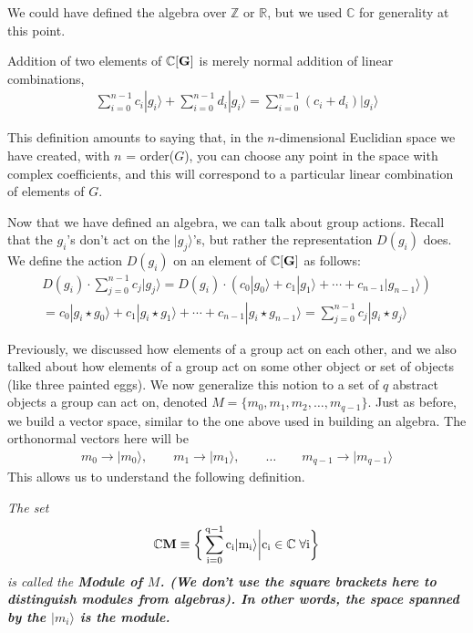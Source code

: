 \documentclass[12pt,epsf]{article}
\def\nolabel{\nonumber }
\def\nolabel{\nonumber }
\begin{document}
We could have defined the algebra over $\mathbb{Z}$ or $\mathbb{R}$,
but we used $\mathbb{C}$ for generality at this point.	

Addition of two elements of $\mathbb{C}[\bf G\rm]$ is merely normal
addition of linear combinations, 
\begin{eqnarray}
\sum_{i=0}^{n-1} c_i |g_i\rangle + \sum_{i=0}^{n-1}d_i|g_i\rangle =
\sum_{i=0}^{n-1}(c_i+d_i)|g_i\rangle \nolabel 
\end{eqnarray}

This definition amounts to saying that, in the $n$-dimensional
Euclidian space we have created, with $n$ = order($G$), you can choose any point in the space
with complex coefficients, and this will correspond to a particular
linear combination of elements of $G$.	

Now that we have defined an algebra, we can talk about group actions. 
Recall that the $g_i$'s don't act on the $|g_j\rangle$'s, but rather
the representation $D(g_i)$ does.  We define the action $D(g_i)$ on an
element of $\mathbb{C}[\bf G\rm]$ as follows:
\begin{eqnarray}
D(g_i) \cdot \sum_{j=0}^{n-1} c_j |g_j\rangle = D(g_i) \cdot
(c_0|g_0\rangle + c_1|g_1\rangle+ \cdots + c_{n-1}|g_{n-1}\rangle)
\nolabel \\
= c_0|g_i\star g_0\rangle + c_1|g_i \star g_1\rangle + \cdots +
c_{n-1}|g_i \star g_{n-1}\rangle = \sum_{j=0}^{n-1} c_j|g_i \star
g_j\rangle\nolabel 
\end{eqnarray}

Previously, we discussed how elements of a group act on each other, and
we also talked about how elements of a group act on some other object
or set of objects (like three painted eggs).  We now generalize this
notion to a set of $q$ abstract objects a group can act on, denoted $M
= \{m_0,m_1,m_2,\ldots,m_{q-1}\}$.  Just as before, we build a vector
space, similar to the one above used in building an algebra.  The
orthonormal vectors here will be 
\begin{eqnarray}
m_0 \rightarrow |m_0\rangle, \qquad m_1 \rightarrow |m_1\rangle, \qquad
\ldots \qquad m_{q-1}  \rightarrow |m_{q-1}\rangle \nolabel 
\end{eqnarray}
This allows us to understand the following definition.

\it The set 
\begin{eqnarray}
\mathbb{C}\bf M\rm \equiv \bigg\{\sum_{i=0}^{q-1}c_i|m_i\rangle \bigg|
c_i \in \mathbb{C} \; \forall i\bigg\}\nolabel 
\end{eqnarray}
is called the \bf Module \it of $M$\rm.  
(We don't use the square brackets here to distinguish modules from
algebras).  In other words, the space spanned by the $|m_i\rangle$ is
the module.  
\end{document}
